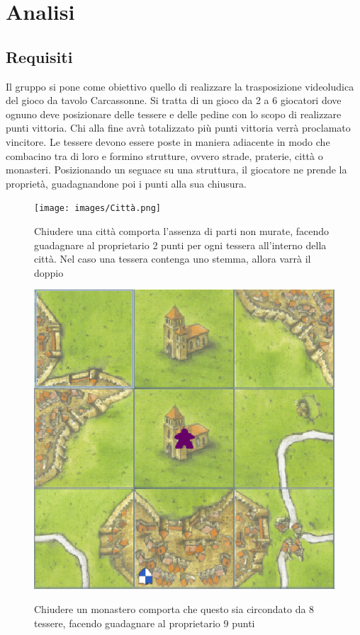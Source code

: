 \section{Analisi}
\subsection{Requisiti}

Il gruppo si pone come obiettivo quello di realizzare la trasposizione videoludica del gioco da tavolo Carcassonne. Si tratta di un gioco da 2 a 6 giocatori dove ognuno deve posizionare delle tessere e delle pedine con lo scopo di realizzare punti vittoria. Chi alla fine avrà totalizzato più punti vittoria verrà proclamato vincitore. Le tessere devono essere poste in maniera adiacente in modo che combacino tra di loro e formino strutture, ovvero strade, praterie, città o monasteri. Posizionando un seguace su una struttura, il giocatore ne prende la proprietà, guadagnandone poi i punti alla sua chiusura.

\begin{figure}[]
    {\texttt{[image: images/Città.png]}}

    \caption{Chiudere una città comporta l’assenza di parti non murate, facendo guadagnare al proprietario 2 punti per ogni tessera all'interno della città. Nel caso una tessera contenga uno stemma, allora varrà il doppio}
\end{figure}

\begin{figure}[]
    {\includegraphics[]{images/MonasteroMeeple.png}}

    \caption{Chiudere un monastero comporta che questo sia circondato da 8 tessere, facendo guadagnare al proprietario 9 punti}
\end{figure}

